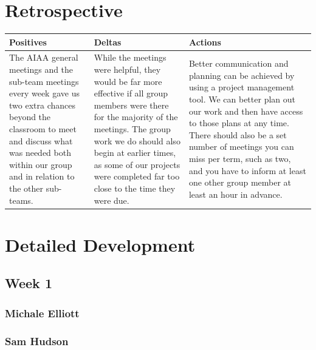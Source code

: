 \documentclass[onecolumn, draftclsnofoot,10pt, compsoc]{IEEEtran}
\begin{document}
\section {Retrospective}
\begin {center}
 \begin {tabular} { | p{5cm} | p{5cm} | p{5cm} | }
 \hline
 Positives & Deltas & Actions \\
 \hline
 The AIAA general meetings and the sub-team meetings every week gave us two extra chances beyond the classroom to meet and discuss what was needed both within our group and in relation to the other sub-teams. & While the meetings were helpful, they would be far more effective if all group members were there for the majority of the meetings. The group work we do should also begin at earlier times, as some of our projects were completed far too close to the time they were due. & Better communication and planning can be achieved by using a project management tool. We can better plan out our work and then have access to those plans at any time. There should also be a set number of meetings you can miss per term, such as two, and you have to inform at least one other group member at least an hour in advance. \\
 \hline
 \end {tabular}
\end {center} 
\section {Detailed Development}
\subsection {Week 1}
\subsubsection{Michale Elliott}
\subsubsection{Sam Hudson}
\end{document}
